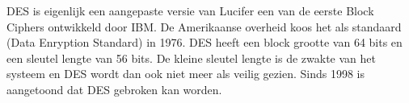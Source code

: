 DES is eigenlijk een aangepaste versie van Lucifer een van de eerste Block Ciphers ontwikkeld door IBM. De Amerikaanse overheid koos het als standaard (Data Enryption Standard) in 1976. DES heeft een block grootte van 64 bits en een sleutel lengte van 56 bits. De kleine sleutel lengte is de zwakte van het systeem en DES wordt dan ook niet meer als veilig gezien. Sinds 1998 is aangetoond dat DES gebroken kan worden.


